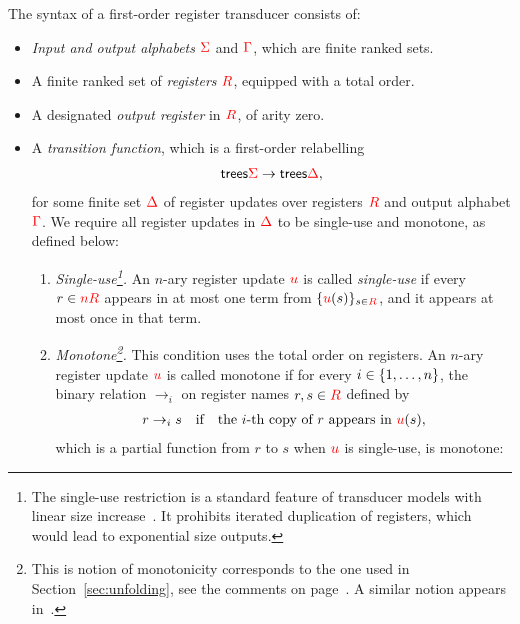 \begin{definition}\label{def:stt}
The syntax of a first-order register transducer consists of: 
\begin{itemize}
    \item \emph{Input and output alphabets} ${\color{red}{\Sigma}}$ and ${\color{red}{\Gamma}}$, which are finite ranked sets.
    \item A finite ranked set of \emph{registers} ${{\color{red}{R}}}$, equipped with a total order.
    \item A designated \emph{output register} in ${{\color{red}{R}}}$, of arity zero.
    \item A \emph{transition function}, which is a  first-order  relabelling
    \begin{align*}
      \mathsf {trees}{{\color{red}{\Sigma}}} \to \mathsf {trees}{{\color{red}{\Delta}}},
    \end{align*}for some finite set ${\color{red}{\Delta}}$ of  register updates over registers ${{\color{red}{R}}}$ and output alphabet ${\color{red}{\Gamma}}$. We require  all register updates in  ${\color{red}{\Delta}}$ to be single-use and monotone, as defined below:
    \begin{enumerate}
        \item \emph{Single-use\footnote{The  single-use restriction  is a standard feature of transducer models with linear size increase~\cite{bloem_comparison_2000, alurStreamingStringTransducers2011,alur2017streaming}.   It prohibits iterated duplication of registers, which would lead to exponential size outputs.    
        }.}  An $n$-ary register update ${\color{red}{u}}$ is  called  \emph{single-use} if   every $r \in {\color{red}{n {{\color{red}{R}}}}}$
        appears in at most one term from $\{{\color{red}{u}}(s)\}_{s \in {{\color{red}{R}}}}$, and it appears at most once in that term. 
        \item \emph{Monotone\footnote{This is notion of monotonicity corresponds to the one used in Section~\ref{sec:unfolding}, see the comments on page~\pageref{page:monotone-discussed}. A similar notion  appears in~\cite[p. 7]{bojanczykRegularFirstOrderList2018}.}.} This condition uses the total order on registers.  An $n$-ary  register update ${\color{red}{u}}$ is called monotone  if for every $i \in \{1,\ldots,n\}$, the binary relation $\to_i$ on register names $r,s \in {{\color{red}{R}}}$  defined by
        \begin{align*} 
            r \to_i s \quad \text{if} \quad  \text{the $i$-th copy of $r$ appears in ${\color{red}{u}}(s)$},
        \end{align*}
        which is a partial function from $r$ to $s$ when ${\color{red}{u}}$ is single-use, is monotone:

\end{enumerate}
\end{itemize}
\end{definition}
